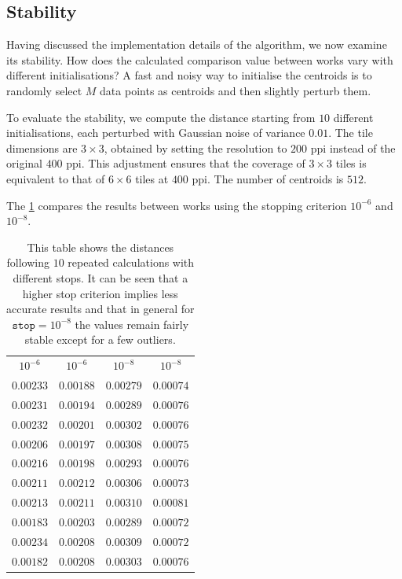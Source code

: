 \begin{toReview}
	\subsection{Stability} Having discussed the implementation details of the algorithm, we now examine its stability. How does the calculated comparison value between works vary with different initialisations? A fast and noisy way to initialise the centroids is to randomly select $M$ data points as centroids and then slightly perturb them.

	\noindent To evaluate the stability, we compute the distance starting from $10$ different initialisations, each perturbed with Gaussian noise of variance $0.01$. The tile dimensions are $3\times3$, obtained by setting the resolution to $200$ \gls{ppi} instead of the original $400$ \gls{ppi}. This adjustment ensures that the coverage of $3\times3$ tiles is equivalent to that of $6\times6$ tiles at $400$ \gls{ppi}. The number of centroids is $512$.

	\noindent The \cref{tab:distStability} compares the results between works using the stopping criterion $10^{-6}$ and $10^{-8}$.

	\begin{table}[H]
		\centering
		\begin{tabular}{|c|c|c|c|}
			\hline
			\rowcolor{ambra}
			\multicolumn{4}{|c|}{stop criteria} \\
			\hline
			\rowcolor{lavender}
			$10^{-6}$ & $10^{-6}$ & $10^{-8}$ & $10^{-8}$ \\
			\hline
			$0.00233$ & $0.00188$ & $0.00279$ & $0.00074$ \\
			\hline
			$0.00231$ & $0.00194$ & $0.00289$ & $0.00076$ \\
			\hline
			$0.00232$ & $0.00201$ & $0.00302$ & $0.00076$ \\
			\hline
			$0.00206$ & $0.00197$ & $0.00308$ & $0.00075$ \\
			\hline
			$0.00216$ & $0.00198$ & $0.00293$ & $0.00076$ \\
			\hline
			$0.00211$ & $0.00212$ & $0.00306$ & $0.00073$ \\
			\hline
			$0.00213$ & $0.00211$ & $0.00310$ & $0.00081$ \\
			\hline
			$0.00183$ & $0.00203$ & $0.00289$ & $0.00072$ \\
			\hline
			$0.00234$ & $0.00208$ & $0.00309$ & $0.00072$ \\
			\hline
			$0.00182$ & $0.00208$ & $0.00303$ & $0.00076$ \\
			\hline
		\end{tabular}
		\caption[Stability of comparison algorithm]{This table shows the distances following $10$ repeated calculations with different stops. It can be seen that a higher stop criterion implies less accurate results and that in general for $\texttt{stop}=10^{-8}$ the values remain fairly stable except for a few outliers.}
		\label{tab:distStability}
	\end{table}


\end{toReview}
